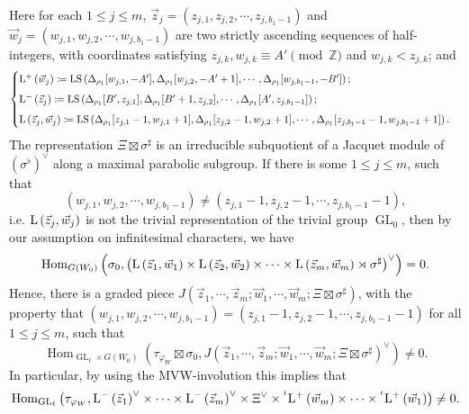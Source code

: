 \documentclass[11pt,letterpaper]{amsart}
\theoremstyle{plain}
\numberwithin{theorem}{section}
\numberwithin{equation}{subsection}
\theoremstyle{remark}
\newcommand{\Hom}{\operatorname{Hom}}
\newcommand{\GL}{\operatorname{GL}}
\newcommand{\LS}{\operatorname{LS}} %
\newcommand{\Z}{\mathbb{Z}}
\begin{document}
Here for each $1\leq j\leq m$, $\vec{z}_j = \left(z_{j,1},z_{j,2},\cdots,z_{j,b_1-1}\right)$ and $\vec{w}_j = \left(w_{j,1},w_{j,2},\cdots,w_{j,b_1-1}\right)$ are two strictly ascending sequences of half-integers, with coordinates satisfying $z_{j,k}, w_{j,k}\equiv A' \pmod \Z$ and $w_{j,k}<z_{j,k}$; and
\[
        \begin{cases}
            {\rm L}^+\left(\vec{w}_j\right)\coloneqq \LS\left(\Delta_{\rho_1}[w_{j,1},-A'], \Delta_{\rho_1}[w_{j,2},-A'+1],\cdots, \Delta_{\rho_1}[w_{j,b_1-1},-B']\right);\\[5pt]

            {\rm L}^-\left(\vec{z}_j\right)\coloneqq \LS\left(\Delta_{\rho_1}[B',z_{j,1}], \Delta_{\rho_1}[B'+1,z_{j,2}],\cdots, \Delta_{\rho_1}[A',z_{j,b_1-1}]\right);\\[5pt]

            {\rm L}\left(\vec{z}_j,\vec{w}_j\right)\coloneqq \LS\left(\Delta_{\rho_1}[z_{j,1}-1,w_{j,1}+1], \Delta_{\rho_1}[z_{j,2}-1,w_{j,2}+1],\cdots, \Delta_{\rho_1}[z_{j,b_1-1}-1,w_{j,b_1-1}+1]\right).
        \end{cases}
     \]
The representation $\Xi\boxtimes \sigma^\sharp$ is an irreducible subquotient of a Jacquet module of $\left(\sigma^\flat\right)^\vee$ along a maximal parabolic subgroup. If there is some $1\leq j\leq m$, such that
\[
    \left(w_{j,1},w_{j,2},\cdots,w_{j,b_1-1}\right) \neq \left(z_{j,1}-1,z_{j,2}-1,\cdots,z_{j,b_1-1}-1\right),
\]
i.e. ${\rm L}\left(\vec{z}_j,\vec{w}_j\right)$ is not the trivial representation of the trivial group $\GL_0$, then by our assumption on infinitesimal characters, we have
\[
    \Hom_{G\left(W_0\right)}\left(\sigma_0,\left({\rm L}\left(\vec{z}_1,\vec{w}_1\right)\times{\rm L}\left(\vec{z}_2,\vec{w}_2\right)\times\cdots\times {\rm L}\left(\vec{z}_m,\vec{w}_m\right)\rtimes \sigma^\sharp\right)^\vee\right)=0.
\]
Hence, there is a graded piece $J\left(\vec{z}_1,\cdots,\vec{z}_m;\vec{w}_1,\cdots,\vec{w}_m;\Xi\boxtimes\sigma^\sharp\right)$, with the property that $\left(w_{j,1},w_{j,2},\cdots,w_{j,b_1-1}\right) =\left(z_{j,1}-1,z_{j,2}-1,\cdots,z_{j,b_1-1}-1\right)$ for all $1\leq j\leq m$, such that
\[
    \Hom_{\GL_{\ell}\times G\left(W_0\right)}\left(\tau_{\varphi_W}\boxtimes\sigma_0,J\left(\vec{z}_1,\cdots,\vec{z}_m;\vec{w}_1,\cdots,\vec{w}_m;\Xi\boxtimes\sigma^\sharp\right)^\vee\right)\neq0.
\]
In particular, by using the MVW-involution this implies that
\[
    \Hom_{\GL_\ell}\left(\tau_{\varphi_W},{\rm L}^-\left(\vec{z}_1\right)^\vee\times\cdots\times {\rm L}^-\left(\vec{z}_m\right)^\vee\times \Xi^\vee \times \prescript{\iota}{}{{\rm L}^+\left(\vec{w}_m\right)}\times\cdots\times\prescript{\iota}{}{{\rm L}^+\left(\vec{w}_1\right)}\right)\neq0.
\]
\end{document}
